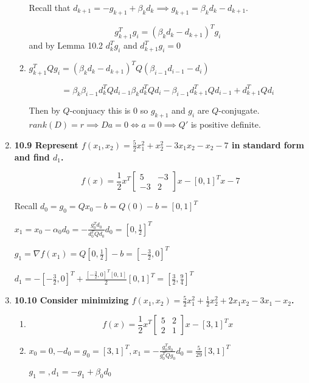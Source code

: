 \documentclass[10pt,a4paper]{article}
\begin{document}
\begin{enumerate}
\begin{enumerate}
        Recall that $d_{k+1} = -g_{k+1} + \beta_k d_k \implies  g_{k+1} = \beta_k d_k - d_{k+1}$.

        $$g_{k+1}^Tg_i = (\beta_k d_k -d_{k+1})^T g_i$$ and by Lemma 10.2 $d_k^Tg_i$ and $d_{k+1}^Tg_i = 0$

        \item $g_{k+1}^TQg_i  = (\beta_k d_k - d_{k+1})^TQ(\beta_{i-1} d_{i-1} - d_i)$
        
        $$ = \beta_k\beta_{i-1} d_k^TQd_{i-1}   \beta_k d_k^TQd_{i} - \beta_{i-1} d_{k+1}^TQd_{i-1} + d_{k+1}^TQd_i$$

        Then by $Q$-conjuacy this is 0 so $g_{k+1}$ and $g_i$ are $Q$-conjugate. $rank(D) = r \implies Da = 0 \iff a =0 \implies Q'$ is positive definite.

    \end{enumerate}

    \item \textbf{10.9 Represent $f(x_1, x_2) = \frac{5}{2}x_1^2 +x_2^2 - 3x_1x_2 -x_2 -7$ in standard form and find $d_1$.}
    
    $$f(x) = \frac{1}{2}x^T\begin{bmatrix} 5 & -3 \\ -3 & 2\end{bmatrix}x - [0, 1]^Tx - 7$$
    
    Recall $d_0 = g_0 = Qx_0-b = Q(0) - b = [0, 1]^T$

    $x_1 = x_0 - \alpha_0 d_0 = -\frac{g_0^Td_0}{d_0^TQd_0} d_0=[0, \frac{1}{2}]^T$

    $g_1 = \nabla f(x_1) = Q[0, \frac{1}{2}] -b = [-\frac{3}{2}, 0]^T$

    $d_1 = -[-\frac{3}{2}, 0]^T + \frac{[-\frac{3}{2}, 0]^T[0, 1]}{2} [0,1]^T = [\frac{3}{2}, \frac{9}{4}]^T$

    \item \textbf{10.10 Consider minimizing $f(x_1, x_2) = \frac{5}{2}x_1^2 +\frac{1}{2}x_2^2 + 2x_1x_2 -3x_1 - x_2$.} 
    \begin{enumerate}
        \item $$f(x) = \frac{1}{2}x^T\begin{bmatrix} 5 & 2 \\ 2 & 1\end{bmatrix}x - [3, 1]^Tx$$
        \item $x_0 = 0, -d_0 = g_0 = [3, 1]^T, x_1 = -\frac{g_0^Tg_0}{g_0^TQg_0} d_0 = \frac{5}{29}[3, 1]^T$
        
        $g_1 = ,d_1 = - g_1+ \beta_0 d_0 $


\end{enumerate}
\end{enumerate}
\end{document}
